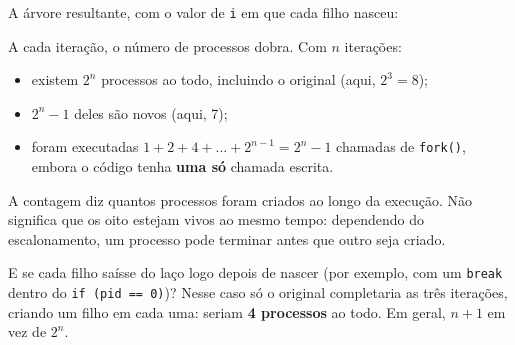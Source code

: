 \documentclass[11pt,a4paper]{article}
\newcommand{\cmd}[1]{\texttt{#1}}
\begin{document}
A árvore resultante, com o valor de \cmd{i} em que cada filho nasceu:

\begin{center}
\end{center}

A cada iteração, o número de processos dobra. Com $n$ iterações:

\begin{itemize}
    \item existem $2^n$ processos ao todo, incluindo o original (aqui, $2^3 = 8$);
    \item $2^n - 1$ deles são novos (aqui, 7);
    \item foram executadas $1 + 2 + 4 + \dots + 2^{n-1} = 2^n - 1$ chamadas de \cmd{fork()}, embora o código tenha \textbf{uma só} chamada escrita.
\end{itemize}

\begin{alerta}
A contagem diz quantos processos foram criados ao longo da execução. Não significa que os oito estejam vivos ao mesmo tempo: dependendo do escalonamento, um processo pode terminar antes que outro seja criado.
\end{alerta}

\begin{pergunta}
E se cada filho saísse do laço logo depois de nascer (por exemplo, com um \cmd{break} dentro do \cmd{if (pid == 0)})? Nesse caso só o original completaria as três iterações, criando um filho em cada uma: seriam \textbf{4 processos} ao todo. Em geral, $n + 1$ em vez de $2^n$.
\end{pergunta}
\end{document}
